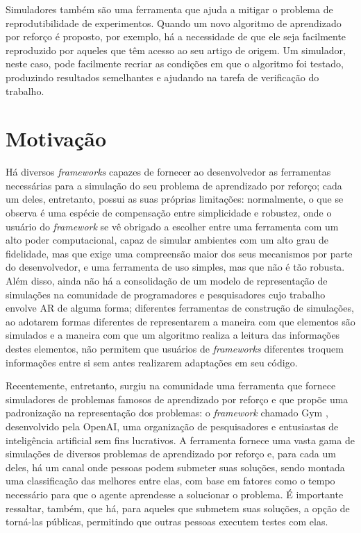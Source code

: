 \documentclass[cic,tc]{iiufrgs}
\begin{document}
Simuladores também são uma ferramenta que ajuda a mitigar o problema de
reprodutibilidade de experimentos. Quando um novo algoritmo de aprendizado
por reforço é proposto, por exemplo, há a necessidade de que ele seja facilmente
reproduzido por aqueles que têm acesso ao seu artigo de origem. Um simulador,
neste caso, pode facilmente recriar as condições em que o algoritmo foi testado,
produzindo resultados semelhantes e ajudando na tarefa de verificação do
trabalho.


\section{Motivação}
Há diversos \textit{frameworks} capazes de fornecer ao desenvolvedor as
ferramentas necessárias para a simulação do seu problema de aprendizado por
reforço; cada um deles, entretanto, possui as suas próprias limitações: normalmente, o
que se observa é uma espécie de compensação entre simplicidade e robustez, onde
o usuário do \textit{framework} se vê obrigado a escolher entre uma ferramenta
com um alto poder computacional, capaz de simular ambientes com um alto grau de
fidelidade, mas que exige uma compreensão maior dos seus mecanismos por parte do
desenvolvedor, e uma ferramenta de uso simples, mas que não é tão robusta. Além
disso, ainda não há a consolidação de um modelo de representação de simulações
na comunidade de programadores e pesquisadores cujo trabalho envolve AR de
alguma forma; diferentes ferramentas de construção de simulações, ao adotarem
formas diferentes de representarem a maneira com que elementos são simulados e a
maneira com que um algoritmo realiza a leitura das informações destes elementos,
não permitem que usuários de \textit{frameworks} diferentes troquem informações
entre si sem antes realizarem adaptações em seu código.


Recentemente, entretanto, surgiu na comunidade uma ferramenta que fornece
simuladores de problemas famosos de aprendizado por reforço e que propõe uma
padronização na representação dos problemas: o \textit{framework} chamado Gym \cite{Gym2016},
desenvolvido pela OpenAI, uma organização de pesquisadores e entusiastas
de inteligência artificial sem fins lucrativos. A ferramenta fornece uma vasta
gama de simulações de diversos problemas de aprendizado por reforço e, para
cada um deles, há um canal onde pessoas podem submeter suas soluções, sendo
montada uma classificação das melhores entre elas, com base em fatores como
o tempo necessário para que o agente aprendesse a solucionar o problema. É
importante ressaltar, também, que há, para aqueles que submetem suas soluções,
a opção de torná-las públicas, permitindo que outras pessoas executem testes
com elas.
\end{document}
